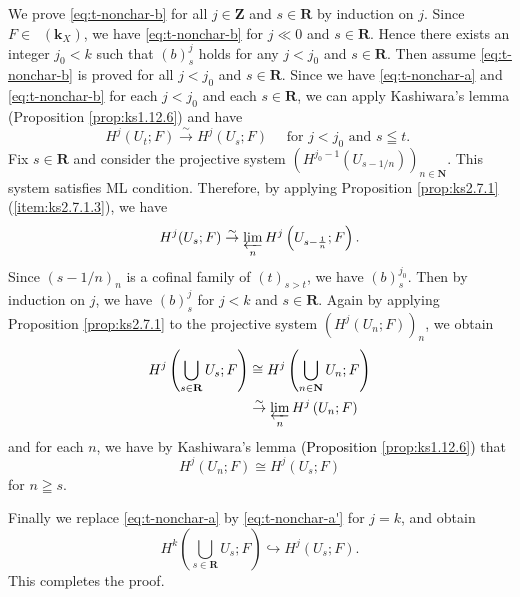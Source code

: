 ﻿\documentclass[a4paper,leqno,dvipdfmx]{jsarticle}
\makeatletter
\theoremstyle{definition}
\newcommand{\nn}{\mathbf{N}}
\newcommand{\zz}{\mathbf{Z}}
\newcommand{\rr}{\mathbf{R}}
\newcommand{\kk}{\mathbf{k}}
\renewenvironment{proof}[1][\proofname]{\par
  \pushQED{\qed}%
  \normalfont \topsep6\p@\@plus6\p@\relax
  \trivlist
  \item[\hskip\labelsep
         \bfseries
    {#1}]\ignorespaces
}{%
  \popQED\endtrivlist\@endpefalse
}
\renewcommand{\proofname}{Proof.}
\numberwithin{equation}{section}
\newcommand{\Dompl}{\mathop{\mathsf{D}^\mathrm{+}}\nolimits}
\newcommand{\simar}{\mathrel{\overset{\sim}{\rightarrow}}}%
\newcommand{\prolim}[1][]{\mathop{\varprojlim}\limits_{#1}}
\theoremstyle{mystyle}
\makeatother
\begin{document}
\begin{proof}[{\textcolor{black}{Proof of Theorem \ref{prp:t-nonchar}}}]
  We prove \ref{eq:t-nonchar-b} for 
  all \(j\in\zz\) and \(s\in\rr\) by induction on \(j\). 
  Since \(F\in\Dompl(\kk_X)\), 
  we have \ref{eq:t-nonchar-b} for \(j\ll 0\) and \(s\in\rr\). 
  Hence there exists an integer \(j_{0}<k\) 
  such that \((b)_{s}^{j}\) holds 
  for any \(j<j_{0}\) and \(s\in\rr\).  
  Then assume \ref{eq:t-nonchar-b} is proved for 
  all \(j< j_{0}\) and \(s\in\rr\). 
  Since we have \ref{eq:t-nonchar-a} and \ref{eq:t-nonchar-b} 
  for each \(j< j_{0}\) and each \(s\in\rr\), 
  we can apply 
  Kashiwara's lemma (Proposition \ref{prop:ks1.12.6}) 
  and have\[
    H^{j}(U_{t};F)\simar H^{j}(U_{s};F) 
    \quad
    \text{ for \(j< j_{0}\) and \(s\leqq t\). }
  \]
  Fix \(s\in\rr\) and consider the projective system \(
    \left(H^{j_{0}-1}(U_{s-1/n})\right)_{n\in\nn}
  \). This system satisfies ML condition.  
  Therefore, by applying 
  Proposition \ref{prop:ks2.7.1} (\ref{item:ks2.7.1.3}), 
  we have \[
    H^{j}(U_{s};F)
    \simar 
    \prolim[n]H^{j}\left(U_{s-\frac{1}{n}};F\right). 
  \]
  Since \((s-1/n)_{n}\) is a cofinal family of \((t)_{s>t}\), 
  we have \((b)_{s}^{j_{0}}\). 
  Then by induction on \(j\), 
  we have \((b)_{s}^{j}\) for \(j<k\) and \(s\in\rr\). 
  Again by applying Proposition \ref{prop:ks2.7.1} to the 
  projective system \(\left(H^{j}(U_{n};F)\right)_{n}\), 
  we obtain 
  \begin{align*}
    H^{j}\left(\bigcup_{s\in\rr}U_{s};F\right)
    &\cong
    H^{j}\left(\bigcup_{n\in\nn}U_{n};F\right)\\
    &\simar 
    \prolim[n]H^{j}\left(U_{n};F\right)
  \end{align*}
  and for each \(n\), we have by Kashiwara's lemma 
  \textcolor{black}{(Proposition \ref{prop:ks1.12.6})} that
  \[
    H^{j}\left(U_{n};F\right)
    \cong
    H^{j}(U_{s};F)
  \]
  for \(n\geqq s\).

  Finally we replace \ref{eq:t-nonchar-a} by 
  \ref{eq:t-nonchar-a'} for \(j=k\), and obtain
  \[
    H^{k}\left(\bigcup_{s\in\rr}U_{s};F\right)
    \hookrightarrow
    H^{j}\left(U_{s};F\right).
  \]
  This completes the proof. 
\end{proof}
\end{document}
